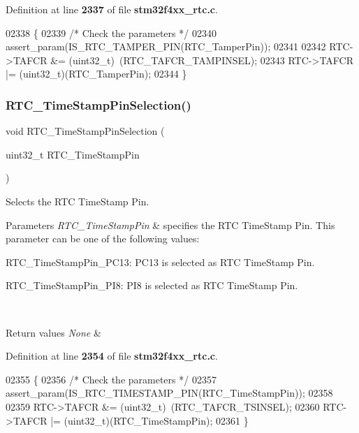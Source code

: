 Definition at line \textbf{ 2337} of file \textbf{ stm32f4xx\+\_\+rtc.\+c}.


\begin{DoxyCode}
02338 \{
02339   \textcolor{comment}{/* Check the parameters */}
02340   assert_param(IS_RTC_TAMPER_PIN(RTC\_TamperPin));
02341   
02342   RTC->TAFCR &= (uint32\_t)~(RTC_TAFCR_TAMPINSEL);
02343   RTC->TAFCR |= (uint32\_t)(RTC\_TamperPin);  
02344 \}
\end{DoxyCode}
\mbox{\label{group__RTC__Group11_gaedf9830bdaaaa50ea5d45d2ff7bb43a9}} 
\subsubsection{R\+T\+C\+\_\+\+Time\+Stamp\+Pin\+Selection()}
{\footnotesize\ttfamily void R\+T\+C\+\_\+\+Time\+Stamp\+Pin\+Selection (\begin{DoxyParamCaption}\item[{uint32\+\_\+t}]{R\+T\+C\+\_\+\+Time\+Stamp\+Pin }\end{DoxyParamCaption})}



Selects the R\+TC Time\+Stamp Pin. 


\begin{DoxyParams}{Parameters}
{\em R\+T\+C\+\_\+\+Time\+Stamp\+Pin} & specifies the R\+TC Time\+Stamp Pin. This parameter can be one of the following values\+: \begin{DoxyItemize}
\item R\+T\+C\+\_\+\+Time\+Stamp\+Pin\+\_\+\+P\+C13\+: P\+C13 is selected as R\+TC Time\+Stamp Pin. \item R\+T\+C\+\_\+\+Time\+Stamp\+Pin\+\_\+\+P\+I8\+: P\+I8 is selected as R\+TC Time\+Stamp Pin. \end{DoxyItemize}
\\
\hline
\end{DoxyParams}

\begin{DoxyRetVals}{Return values}
{\em None} & \\
\hline
\end{DoxyRetVals}


Definition at line \textbf{ 2354} of file \textbf{ stm32f4xx\+\_\+rtc.\+c}.


\begin{DoxyCode}
02355 \{
02356   \textcolor{comment}{/* Check the parameters */}
02357   assert_param(IS_RTC_TIMESTAMP_PIN(RTC\_TimeStampPin));
02358   
02359   RTC->TAFCR &= (uint32\_t)~(RTC_TAFCR_TSINSEL);
02360   RTC->TAFCR |= (uint32\_t)(RTC\_TimeStampPin);  
02361 \}
\end{DoxyCode}
